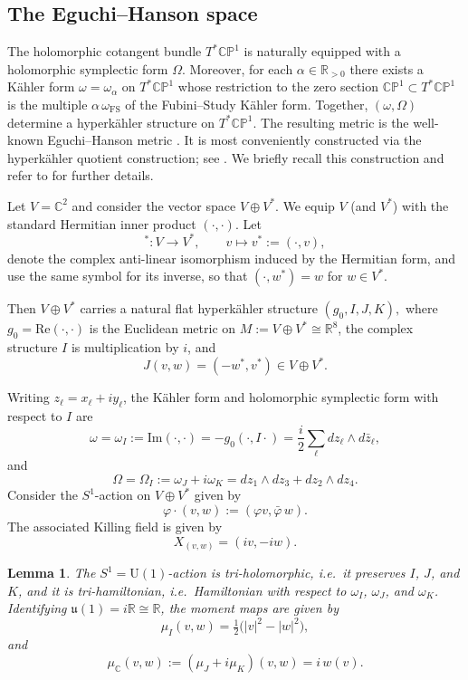 \documentclass[12pt,a4paper]{amsart}
\newtheorem{lemma}[theorem]{Lemma}
\theoremstyle{definition}
\theoremstyle{remark}
\newcommand{\R}{\mathbb R}
\newcommand{\C}{\mathbb C}
\newcommand{\CP}{\mathbb{CP}}
\begin{document}
\subsection{The Eguchi--Hanson space}

The holomorphic cotangent bundle $T^*\CP^1$ is naturally equipped with a holomorphic
symplectic form $\Omega$.
Moreover, for each $\alpha\in\R_{>0}$ there exists a K\"ahler form
$\omega=\omega_\alpha$ on $T^*\CP^1$ whose restriction to the zero section
$\CP^1\subset T^*\CP^1$ is the multiple $\alpha\,\omega_{\mathrm{FS}}$ of the
Fubini--Study K\"ahler form.
Together, $(\omega,\Omega)$ determine a hyperk\"ahler structure on $T^*\CP^1$.
The resulting metric is the well-known Eguchi--Hanson metric \cite{Calabi}.
It is most conveniently constructed via the hyperk\"ahler quotient construction; see
\cite{HKLR}. We briefly recall this construction and refer to \cite{Hitchin91, Konno2} for further
details.


Let $V=\C^2$ and consider the vector space $V\oplus V^*$.
We equip $V$ (and $V^*$) with the standard Hermitian inner product $(\cdot,\cdot)$.
Let
\[
{}^*\colon V\to V^*,\qquad v\mapsto v^*:=(\cdot,v),
\]
denote the complex anti-linear isomorphism induced by the Hermitian form, and use the
same symbol for its inverse, so that $(\cdot,w^*)=w$ for $w\in V^*$.

Then $V\oplus V^*$ carries a natural flat hyperk\"ahler structure
$
(g_0,I,J,K),
$
where $g_0=\mathrm{Re}(\cdot,\cdot)$ is the Euclidean metric on
$M:=V\oplus V^*\cong\R^8$, the complex structure $I$ is multiplication by $i$, and
\[
J(v,w)=(-w^*,v^*)\in V\oplus V^*.
\]

Writing $z_\ell=x_\ell+iy_\ell$, the K\"ahler form and holomorphic symplectic form
with respect to $I$ are
\[
\omega=\omega_I:=\mathrm{Im}(\cdot,\cdot)=-g_0(\cdot,I\cdot)
=\frac{i}{2}\sum_{\ell}dz_\ell\wedge d\bar z_\ell,
\]
and
\[
\Omega=\Omega_I:=\omega_J+i\omega_K
=dz_1\wedge dz_3+dz_2\wedge dz_4.
\]
Consider the $S^1$-action on $V\oplus V^*$ given by
\[
\varphi\cdot(v,w):=(\varphi v,\bar\varphi\, w).
\]
The associated Killing field is given by
\[
X_{(v,w)}=(iv,-iw).
\]


\begin{lemma}
The $S^1=\mathrm{U}(1)$-action is \emph{tri-holomorphic}, i.e.\ it preserves $I$, $J$, and $K$, and it is
\emph{tri-hamiltonian}, i.e.\ Hamiltonian with respect to $\omega_I$, $\omega_J$, and $\omega_K$.
Identifying $\mathfrak{u}(1)=i\R\cong\R$, the moment maps are given by
\[
\mu_I(v,w)=\tfrac12\bigl(|v|^2-|w|^2\bigr),
\]
and
\[
\mu_\C(v,w):=(\mu_J+i\mu_K)(v,w)=i\,w(v).
\]
\end{lemma}
\end{document}
